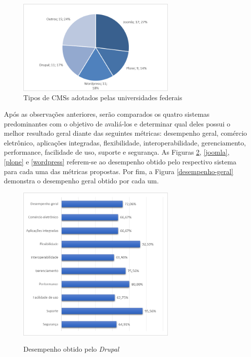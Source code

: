 \begin{figure}[htb]
 \centering
 \caption{Tipos de CMSs adotados pelas universidades federais}
 \includegraphics[width=0.7\textwidth]{figuras/tipos-de-cms}
 
 
 \label{cms-universidade-adocao}
\end{figure}

\newpage
Após as observações anteriores, serão comparados os quatro sistemas predominantes com o objetivo de avaliá-los e determinar qual deles possui o melhor resultado geral diante das seguintes métricas: desempenho geral, comércio eletrônico, aplicações integradas, flexibilidade, interoperabilidade, gerenciamento, performance, facilidade de uso, suporte e segurança. As Figuras \ref{drupal}, \ref{joomla}, \ref{plone} e \ref{wordpress} referem-se ao desempenho obtido pelo respectivo sistema para cada uma das métricas propostas. Por fim, a Figura \ref{desempenho-geral} demonstra o desempenho geral obtido por cada um.


\begin{figure}[htb]
 \centering
 \caption{Desempenho obtido pelo \textit{Drupal}}
 \includegraphics[width=0.7\textwidth]{figuras/desempenho-drupal}
 \label{drupal}
\end{figure}

